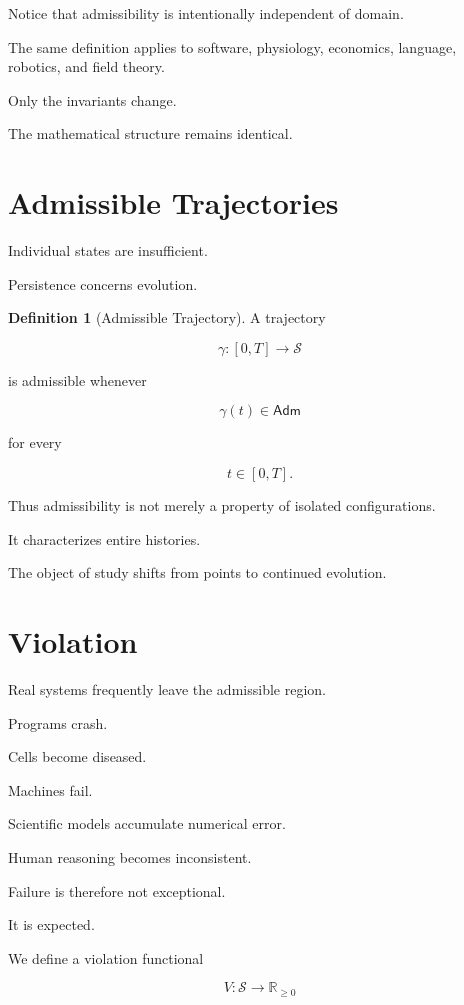 \documentclass[11pt,oneside]{book}
\numberwithin{equation}{chapter}
\theoremstyle{definition}
\newtheorem{definition}{Definition}[chapter]
\theoremstyle{plain}
\newcommand{\State}{\mathcal{S}}
\newcommand{\Adm}{\mathsf{Adm}}
\begin{document}
Notice that admissibility is intentionally independent of domain.

The same definition applies to software, physiology, economics, language,
robotics, and field theory.

Only the invariants change.

The mathematical structure remains identical.

\section{Admissible Trajectories}

Individual states are insufficient.

Persistence concerns evolution.

\begin{definition}[Admissible Trajectory]

A trajectory

\[
\gamma :
[0,T]
\rightarrow
\State
\]

is admissible whenever

\[
\gamma(t)
\in
\Adm
\]

for every

\[
t
\in
[0,T].
\]

\end{definition}

Thus admissibility is not merely a property of isolated configurations.

It characterizes entire histories.

The object of study shifts from points to continued evolution.

\section{Violation}

Real systems frequently leave the admissible region.

Programs crash.

Cells become diseased.

Machines fail.

Scientific models accumulate numerical error.

Human reasoning becomes inconsistent.

Failure is therefore not exceptional.

It is expected.

We define a violation functional

\[
V :
\State
\rightarrow
\mathbb{R}_{\ge 0}
\]
\end{document}
